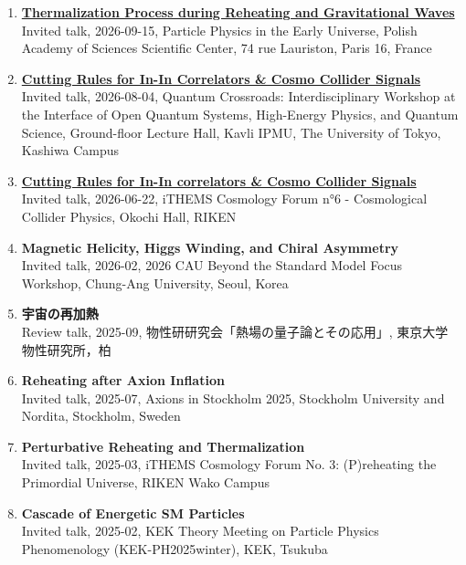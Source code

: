 \begin{enumerate}
\item \textbf{\href{https://indico.ijclab.in2p3.fr/event/13541/}{Thermalization Process during Reheating and Gravitational Waves}}\\ Invited talk, 2026-09-15, Particle Physics in the Early Universe, Polish Academy of Sciences Scientific Center, 74 rue Lauriston, Paris 16, France

\item \textbf{\href{https://indico.ipmu.jp/event/519/}{Cutting Rules for In-In Correlators \& Cosmo Collider Signals}}\\ Invited talk, 2026-08-04, Quantum Crossroads: Interdisciplinary Workshop at the Interface of Open Quantum Systems, High-Energy Physics, and Quantum Science, Ground-floor Lecture Hall, Kavli IPMU, The University of Tokyo, Kashiwa Campus

\item \textbf{\href{https://indico2.riken.jp/event/5612/timetable/#20260622}{Cutting Rules for In-In correlators \& Cosmo Collider Signals}}\\ Invited talk, 2026-06-22, iTHEMS Cosmology Forum n°6 - Cosmological Collider Physics, Okochi Hall, RIKEN

\item \textbf{Magnetic Helicity, Higgs Winding, and Chiral Asymmetry}\\ Invited talk, 2026-02, 2026 CAU Beyond the Standard Model Focus Workshop, Chung-Ang University, Seoul, Korea

\item \textbf{宇宙の再加熱}\\ Review talk, 2025-09, 物性研研究会「熱場の量子論とその応用」, 東京大学物性研究所，柏

\item \textbf{Reheating after Axion Inflation}\\ Invited talk, 2025-07, Axions in Stockholm 2025, Stockholm University and Nordita, Stockholm, Sweden

\item \textbf{Perturbative Reheating and Thermalization}\\ Invited talk, 2025-03, iTHEMS Cosmology Forum No. 3: (P)reheating the Primordial Universe, RIKEN Wako Campus

\item \textbf{Cascade of Energetic SM Particles}\\ Invited talk, 2025-02, KEK Theory Meeting on Particle Physics Phenomenology (KEK-PH2025winter), KEK, Tsukuba


\end{enumerate}
